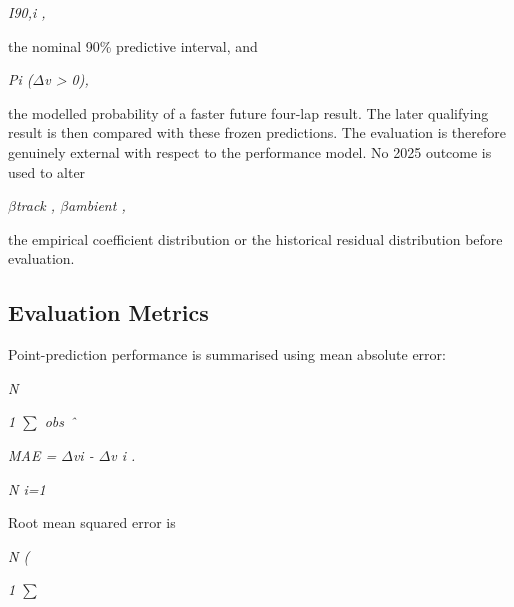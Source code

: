 \begin{center}\textit{I90,i ,}\end{center}

the nominal 90\% predictive interval, and

\begin{center}\textit{Pi (\ensuremath{\Delta}v > 0),}\end{center}

the modelled probability of a faster future four-lap result. The later qualifying result is then compared with these frozen predictions. The evaluation is therefore genuinely external with respect to the performance model. No 2025 outcome is used to alter

\begin{center}\textit{\ensuremath{\beta}track ,        \ensuremath{\beta}ambient ,}\end{center}

the empirical coefficient distribution or the historical residual distribution before evaluation.

\subsection{Evaluation Metrics}
Point-prediction performance is summarised using mean absolute error:

\begin{center}\textit{N}\end{center}

\begin{center}\textit{1 \ensuremath{\sum}  obs ˆ }\end{center}

\begin{center}\textit{MAE =           \ensuremath{\Delta}vi - \ensuremath{\Delta}v i  .}\end{center}

\begin{center}\textit{N i=1}\end{center}

Root mean squared error is

\begin{center}\textit{}\end{center}

\begin{center}\textit{N (}\end{center}

\begin{center}\textit{ 1 \ensuremath{\sum}}\end{center}

